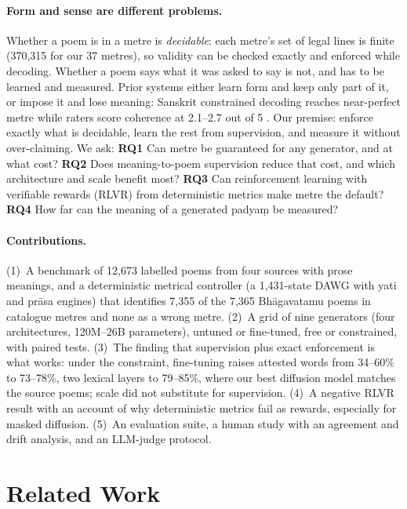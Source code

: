 \documentclass[11pt]{article}
\begin{document}
\paragraph{Form and sense are different problems.} Whether a poem is in a metre is \emph{decidable}: each
metre's set of legal lines is finite (370,315 for our 37 metres), so validity can be checked exactly and
enforced while decoding. Whether a poem says what it was asked to say is not, and has to be learned and
measured. Prior systems either learn form and keep only part of it, or impose it and lose meaning: Sanskrit
constrained decoding reaches near-perfect metre while raters score coherence at 2.1--2.7 out of 5
\citep{jagadeeshan2026chandomitra,jagadeeshan2026pingala}. Our premise: enforce exactly what is decidable,
learn the rest from supervision, and measure it without over-claiming. We ask:
\textbf{RQ1} Can metre be guaranteed for any generator, and at what cost?
\textbf{RQ2} Does meaning-to-poem supervision reduce that cost, and which architecture and scale benefit most?
\textbf{RQ3} Can reinforcement learning with verifiable rewards (RLVR) from deterministic metrics make metre
the default? \textbf{RQ4} How far can the meaning of a generated padyaṃ be measured?

\paragraph{Contributions.}
(1)~A benchmark of 12,673 labelled poems from four sources with prose meanings, and a deterministic metrical
controller (a 1,431-state DAWG with yati and prāsa engines) that identifies 7,355 of the 7,365 Bhāgavatamu poems
in catalogue metres and none as a wrong metre. (2)~A grid of nine generators (four architectures,
120M--26B parameters), untuned or fine-tuned, free or constrained, with paired tests.
(3)~The finding that supervision plus exact enforcement is what works: under the constraint, fine-tuning
raises attested words from 34--60\% to 73--78\%, two lexical layers to 79--85\%, where our best diffusion model
matches the source poems; scale did not substitute for supervision. (4)~A negative RLVR result with an account of why deterministic metrics
fail as rewards, especially for masked diffusion. (5)~An evaluation suite, a human study with an agreement
and drift analysis, and an LLM-judge protocol.

\section{Related Work}\label{sec:related}
\end{document}
